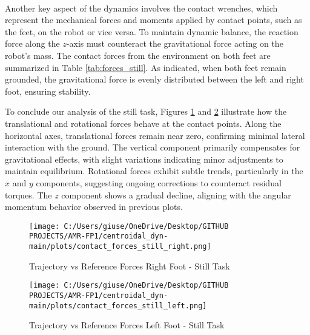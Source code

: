 \documentclass[main.tex]{subfiles}
\begin{document}
\\
Another key aspect of the dynamics involves the contact wrenches, which represent the mechanical forces and moments applied by contact points, such as the feet, on the robot or vice versa. To maintain dynamic balance, the reaction force along the $z$-axis must counteract the gravitational force acting on the robot’s mass. The contact forces from the environment on both feet are summarized in Table \ref{tab:forces_still}. As indicated, when both feet remain grounded, the gravitational force is evenly distributed between the left and right foot, ensuring stability.
\begin{table}[H]
    \centering
    \renewcommand{\arraystretch}{1.2}
    \caption{Summary of Forces and Foot Positions per Interval - Still Task}
    \label{tab:forces_still}
\end{table}
To conclude our analysis of the still task, Figures \ref{fig:contact_forces_still_right} and \ref{fig:contact_forces_still_left} illustrate how the translational and rotational forces behave at the contact points. Along the horizontal axes, translational forces remain near zero, confirming minimal lateral interaction with the ground. The vertical component primarily compensates for gravitational effects, with slight variations indicating minor adjustments to maintain equilibrium. Rotational forces exhibit subtle trends, particularly in the \( x \) and \( y \) components, suggesting ongoing corrections to counteract residual torques. The \( z \) component shows a gradual decline, aligning with the angular momentum behavior observed in previous plots.
\begin{figure}[htbp]
    \centering
    \texttt{[image: C:/Users/giuse/OneDrive/Desktop/GITHUB PROJECTS/AMR-FP1/centroidal\_dyn-main/plots/contact\_forces\_still\_right.png]}
    \caption{Trajectory vs Reference Forces Right Foot - Still Task}
    \label{fig:contact_forces_still_right}
\end{figure}
\begin{figure}[htbp]
    \centering
    \texttt{[image: C:/Users/giuse/OneDrive/Desktop/GITHUB PROJECTS/AMR-FP1/centroidal\_dyn-main/plots/contact\_forces\_still\_left.png]}
    \caption{Trajectory vs Reference Forces Left Foot - Still Task}
    \label{fig:contact_forces_still_left}
\end{figure}
\end{document}
